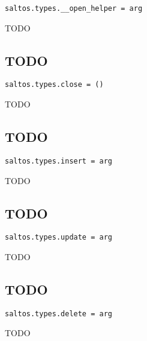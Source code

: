 \documentclass[a4paper]{book}
\begin{document}
\begin{lstlisting}
saltos.types.__open_helper = arg
\end{lstlisting}

TODO

\hypertarget{toc138}{}
\subsection{TODO}

\begin{lstlisting}
saltos.types.close = ()
\end{lstlisting}

TODO

\hypertarget{toc139}{}
\subsection{TODO}

\begin{lstlisting}
saltos.types.insert = arg
\end{lstlisting}

TODO

\hypertarget{toc140}{}
\subsection{TODO}

\begin{lstlisting}
saltos.types.update = arg
\end{lstlisting}

TODO

\hypertarget{toc141}{}
\subsection{TODO}

\begin{lstlisting}
saltos.types.delete = arg
\end{lstlisting}

TODO

\end{document}
